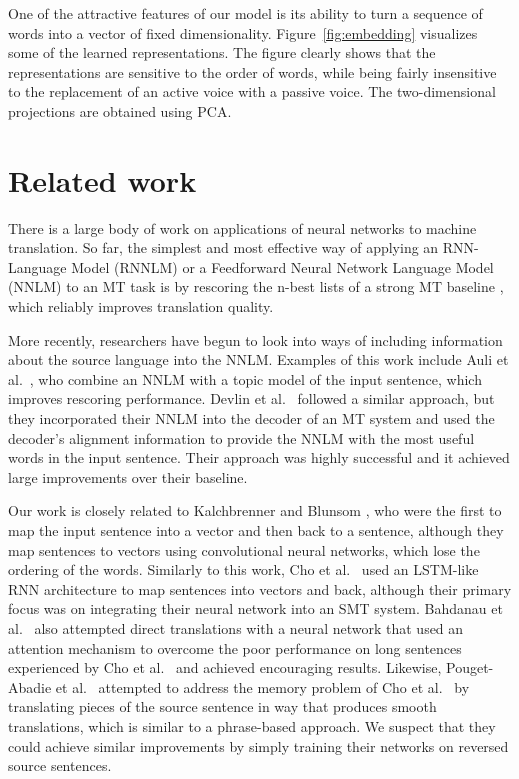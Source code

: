 \documentclass{article} \usepackage{nips14submit_e}
\begin{document}
One of the attractive features of our model is its ability to turn a
sequence of words into a vector of fixed dimensionality.
Figure~\ref{fig:embedding} visualizes some of the learned
representations.  The figure clearly shows that the representations
are sensitive to the order of words, while being fairly insensitive to
the replacement of an active voice with a passive voice.  The
two-dimensional projections are obtained using PCA.






 
\section{Related work}
\label{sec:rel_work}

There is a large body of work on applications of neural networks to
machine translation. So far, the simplest and most effective way of
applying an RNN-Language Model (RNNLM) \cite{mikolov2010recurrent} or
a Feedforward Neural Network Language Model (NNLM) \cite{bengio} to an
MT task is by rescoring the n-best lists of a strong MT baseline
\cite{mikolov2012}, which reliably improves translation quality.

More recently, researchers have begun to look into ways of including
information about the source language into the NNLM.  Examples of this
work include Auli et al.~\cite{auli13}, who combine an NNLM with a
topic model of the input sentence, which improves rescoring
performance.  Devlin et al.~\cite{devlin14} followed a similar
approach, but they incorporated their NNLM into the decoder of an MT
system and used the decoder's alignment information to provide the
NNLM with the most useful words in the input sentence.  Their approach
was highly successful and it achieved large improvements over their
baseline.

Our work is closely related to Kalchbrenner and Blunsom \cite{kal13},
who were the first to map the input sentence into a vector and then
back to a sentence, although they map sentences to vectors using
convolutional neural networks, which lose the ordering of the words.
Similarly to this work, Cho et al.~\cite{cho14} used an LSTM-like RNN
architecture to map sentences into vectors and back, although their
primary focus was on integrating their neural network into an SMT
system.  Bahdanau et al.~\cite{bog14} also attempted direct
translations with a neural network that used an attention mechanism to
overcome the poor performance on long sentences experienced by Cho et
al.~\cite{cho14} and achieved encouraging results.  Likewise,
Pouget-Abadie et al.~\cite{curse} attempted to address the memory
problem of Cho et al.~\cite{cho14} by translating pieces of the source
sentence in way that produces smooth translations, which is similar to
a phrase-based approach.  We suspect that they could achieve similar
improvements by simply training their networks on reversed source
sentences.
\end{document}
